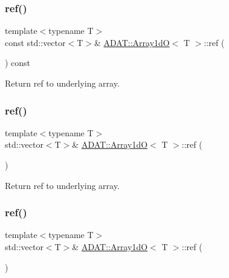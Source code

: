 \subsubsection{\texorpdfstring{ref()}{ref()}\hspace{0.1cm}{\footnotesize\ttfamily [2/4]}}
{\footnotesize\ttfamily template$<$typename T$>$ \\
const std\+::vector$<$T$>$\& \mbox{\hyperlink{classADAT_1_1Array1dO}{A\+D\+A\+T\+::\+Array1dO}}$<$ T $>$\+::ref (\begin{DoxyParamCaption}{ }\end{DoxyParamCaption}) const\hspace{0.3cm}{\ttfamily [inline]}}



Return ref to underlying array. 

\mbox{\label{classADAT_1_1Array1dO_ac3ff9b35bef8e7fa276136673b907749}} 
\subsubsection{\texorpdfstring{ref()}{ref()}\hspace{0.1cm}{\footnotesize\ttfamily [3/4]}}
{\footnotesize\ttfamily template$<$typename T$>$ \\
std\+::vector$<$T$>$\& \mbox{\hyperlink{classADAT_1_1Array1dO}{A\+D\+A\+T\+::\+Array1dO}}$<$ T $>$\+::ref (\begin{DoxyParamCaption}{ }\end{DoxyParamCaption})\hspace{0.3cm}{\ttfamily [inline]}}



Return ref to underlying array. 

\mbox{\label{classADAT_1_1Array1dO_ac3ff9b35bef8e7fa276136673b907749}} 
\subsubsection{\texorpdfstring{ref()}{ref()}\hspace{0.1cm}{\footnotesize\ttfamily [4/4]}}
{\footnotesize\ttfamily template$<$typename T$>$ \\
std\+::vector$<$T$>$\& \mbox{\hyperlink{classADAT_1_1Array1dO}{A\+D\+A\+T\+::\+Array1dO}}$<$ T $>$\+::ref (\begin{DoxyParamCaption}{ }\end{DoxyParamCaption})\hspace{0.3cm}{\ttfamily [inline]}}



